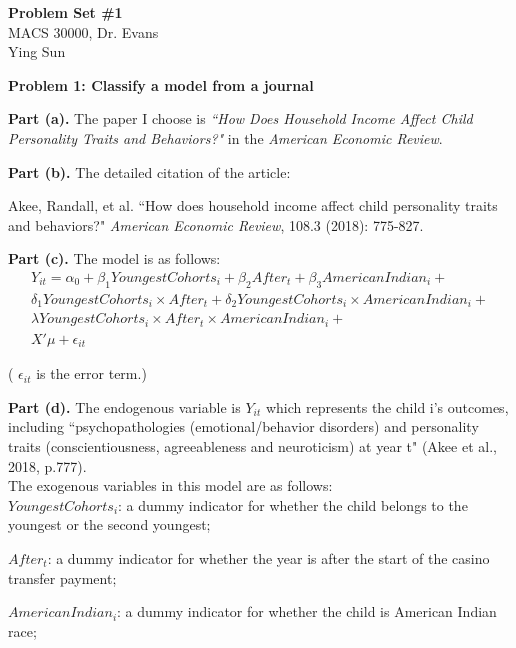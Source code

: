 \documentclass[letterpaper,12pt]{article}
\theoremstyle{definition}
\begin{document}
\begin{flushleft}
  \textbf{\large{Problem Set \#1}} \\
  MACS 30000, Dr. Evans \\
  Ying Sun
\end{flushleft}

\vspace{5mm}

\noindent\textbf{Problem 1: Classify a model from a journal}

\textbf{Part (a).} The paper I choose is \emph{``How Does Household Income Affect Child Personality Traits and Behaviors?"} in the \emph{American Economic Review}.

\textbf{Part (b).} The detailed citation of the article:

Akee, Randall, et al. ``How does household income affect child personality traits and behaviors?" \emph{American Economic Review}, 108.3 (2018): 775-827.

\textbf{Part (c).} The model is as follows: 
\begin{equation*}
\begin{split}
 Y_{it}= \alpha _{0} + \beta _{1}YoungestCohorts_{i} + \beta _{2}After_{t} + \beta _{3}AmericanIndian_{i} +\\
  \delta _{1}YoungestCohorts_{i} \times After_{t} + \delta _{2}YoungestCohorts_{i}\times AmericanIndian_{i} +\\
   \lambda YoungestCohorts_{i}\times After_{t}\times AmericanIndian_{i} +\\ {X}'\mu + \epsilon _{it}
\end{split}
\end{equation*}

( $ \epsilon _{it} $ is the error term.)

\textbf{Part (d).} The endogenous variable is $Y_{it}$ which represents the child i’s outcomes, including ``psychopathologies (emotional/behavior disorders) and personality traits (conscientiousness, agreeableness and neuroticism) at year t" (Akee et al., 2018, p.777).\\
The exogenous variables in this model are as follows:\\
$YoungestCohorts_{i}$: a dummy indicator for whether the child belongs to the youngest or the second youngest;

$After_{t}$: a dummy indicator for whether the year is after the start of the casino transfer payment;

$ AmericanIndian_{i} $: a dummy indicator for whether the child is American Indian race;
\end{document}
